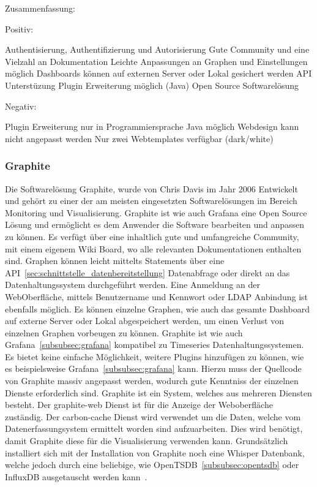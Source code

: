 Zusammenfassung:

Positiv:

\begin{outline}
  \1 Authentisierung, Authentifizierung und Autorisierung
  \1 Gute Community und eine Vielzahl an Dokumentation
  \1 Leichte Anpassungen an Graphen und Einstellungen möglich
  \1 Dashboards können auf externen Server oder Lokal gesichert werden
  \1 API Unterstüzung
  \1 Plugin Erweiterung möglich (Java)
  \1 Open Source Softwarelösung
\end{outline}

Negativ:

\begin{outline}
  \1 Plugin Erweiterung nur in Programmiersprache Java möglich
  \1 Webdesign kann nicht angepasst werden
  \1 Nur zwei Webtemplates verfügbar (dark/white)
\end{outline}

\subsubsection{Graphite}
\label{subsubsec:graphite}
Die Softwarelösung Graphite, wurde von Chris Davis im Jahr 2006 Entwickelt und
gehört zu einer der am meisten eingesetzten Softwarelösungen im Bereich
Monitoring und Visualisierung. Graphite ist wie auch Grafana eine Open Source
Lösung und ermöglicht es dem Anwender die Software bearbeiten und anpassen zu
können. Es verfügt über eine inhaltlich gute und umfangreiche Community, mit
einem eigenem Wiki Board, wo alle relevanten Dokumentationen enthalten sind.
Graphen können leicht mittelts Statements über eine
API~\ref{sec:schnittstelle_datenbereitstellung} Datenabfrage oder direkt an das
Datenhaltungssystem durchgeführt werden. Eine Anmeldung an der WebOberfläche,
mittels Benutzername und Kennwort oder \gls{LDAP} Anbindung ist ebenfalls
möglich. Es können einzelne Graphen, wie auch das gesamte Dashboard auf externe
Server oder Lokal abgespeichert werden, um einen Verlust von einzelnen Graphen
vorbeugen zu können. Graphite ist wie auch Grafana~\ref{subsubsec:grafana}
kompatibel zu Timeseries Datenhaltungssystemen. Es bietet keine einfache
Möglichkeit, weitere Plugins hinzufügen zu können, wie es beispielsweise
Grafana~\ref{subsubsec:grafana} kann. Hierzu muss der Quellcode von Graphite
massiv angepasst werden, wodurch gute Kenntniss der einzelnen Dienste
erforderlich sind. Graphite ist ein System, welches aus mehreren Diensten
besteht. Der graphite-web Dienst ist für die Anzeige der Weboberfläche
zuständig. Der carbon-cache Dienst wird verwendet um die Daten, welche vom
Datenerfassungsystem ermittelt worden sind aufzuarbeiten. Dies wird benötigt,
damit Graphite diese für die Visualisierung verwenden kann. Grundsätzlich
installiert sich mit der Installation von Graphite noch eine Whisper Datenbank,
welche jedoch durch eine beliebige, wie OpenTSDB~\ref{subsubsec:opentsdb} oder
InfluxDB ausgetauscht werden kann~\cite{graphite}.

